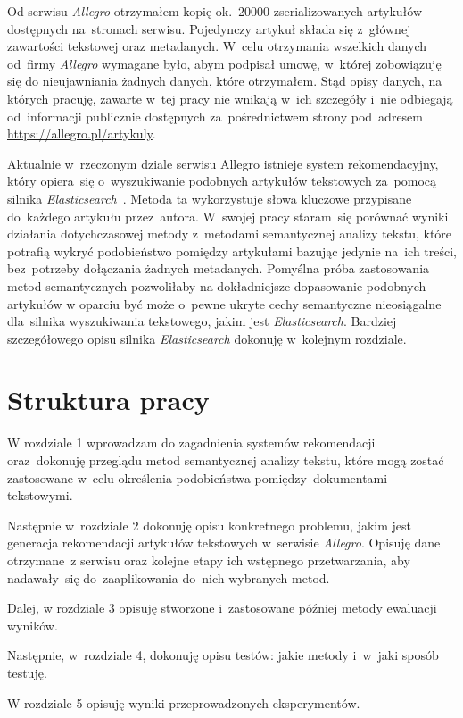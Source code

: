 \documentclass[pl]{minipw} %
\begin{document}
Od serwisu \textit{Allegro} otrzymałem kopię ok.~20000 zserializowanych artykułów dostępnych na~stronach serwisu. Pojedynczy artykuł składa się z~głównej zawartości tekstowej oraz metadanych. W~celu otrzymania wszelkich danych od~firmy \textit{Allegro} wymagane było, abym podpisał umowę, w~której zobowiązuję się do nieujawniania żadnych danych, które otrzymałem. Stąd opisy danych, na których pracuję, zawarte w~tej pracy nie wnikają w~ich szczegóły i~nie odbiegają od~informacji publicznie dostępnych za~pośrednictwem strony pod~adresem \url{https://allegro.pl/artykuly}.

Aktualnie w~rzeczonym dziale serwisu Allegro istnieje system rekomendacyjny, który opiera~się o~wyszukiwanie podobnych artykułów tekstowych za~pomocą silnika \textit{Elasticsearch}~\cite{elastic}. Metoda ta wykorzystuje słowa kluczowe przypisane do~każdego artykułu przez~autora. W~swojej pracy staram~się porównać wyniki działania dotychczasowej metody z~metodami semantycznej analizy tekstu, które potrafią wykryć podobieństwo pomiędzy artykułami bazując jedynie na~ich treści, bez~potrzeby dołączania żadnych metadanych. Pomyślna próba zastosowania metod semantycznych pozwoliłaby na dokładniejsze dopasowanie podobnych artykułów w oparciu być może o~pewne ukryte cechy semantyczne nieosiągalne dla~silnika wyszukiwania tekstowego, jakim jest \textit{Elasticsearch}. Bardziej szczegółowego opisu silnika \textit{Elasticsearch} dokonuję w~kolejnym rozdziale.

\section{Struktura pracy}
W rozdziale 1 wprowadzam do zagadnienia systemów rekomendacji oraz~dokonuję przeglądu metod semantycznej analizy tekstu, które mogą zostać zastosowane w~celu określenia podobieństwa pomiędzy~dokumentami tekstowymi.

Następnie w~rozdziale 2 dokonuję opisu konkretnego problemu, jakim jest generacja rekomendacji artykułów tekstowych w~serwisie \textit{Allegro}. Opisuję dane otrzymane~z serwisu oraz kolejne etapy ich wstępnego przetwarzania, aby nadawały~się do~zaaplikowania do~nich wybranych metod.

Dalej, w rozdziale 3 opisuję stworzone i~zastosowane później metody ewaluacji wyników.

Następnie, w~rozdziale 4, dokonuję opisu testów: jakie metody i~w~jaki sposób testuję.

W rozdziale 5 opisuję wyniki przeprowadzonych eksperymentów.
\end{document}
